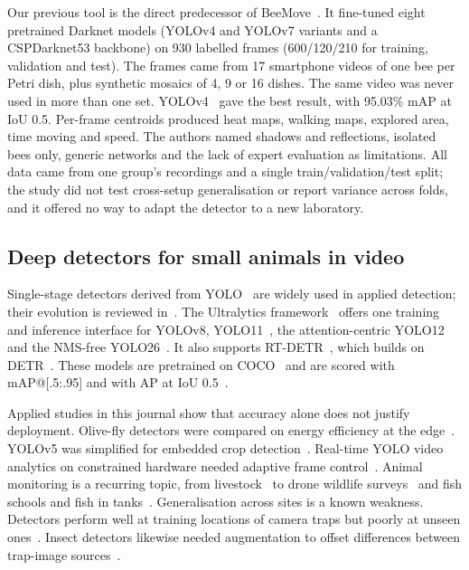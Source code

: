 \documentclass[pdflatex,sn-basic,Numbered]{sn-jnl}
\newcommand{\beemove}{BeeMove}
\theoremstyle{thmstyleone}%
\begin{document}
Our previous tool is the direct predecessor of \beemove{}~\cite{lima2025analyzing}. It fine-tuned eight pretrained Darknet models (YOLOv4 and YOLOv7 variants and a CSPDarknet53 backbone) on 930 labelled frames (600/120/210 for training, validation and test). The frames came from 17 smartphone videos of one bee per Petri dish, plus synthetic mosaics of 4, 9 or 16 dishes. The same video was never used in more than one set. YOLOv4~\cite{bochkovskiy2020yolov4} gave the best result, with 95.03\% mAP at IoU 0.5. Per-frame centroids produced heat maps, walking maps, explored area, time moving and speed. The authors named shadows and reflections, isolated bees only, generic networks and the lack of expert evaluation as limitations. All data came from one group's recordings and a single train/validation/test split; the study did not test cross-setup generalisation or report variance across folds, and it offered no way to adapt the detector to a new laboratory.

\subsection{Deep detectors for small animals in video}\label{sec:rw-detectors}

Single-stage detectors derived from YOLO~\cite{redmon2016you} are widely used in applied detection; their evolution is reviewed in~\cite{terven2023comprehensive,diwan2022object}. The Ultralytics framework~\cite{jocher2023ultralytics} offers one training and inference interface for YOLOv8, YOLO11~\cite{khanam2024yolov11}, the attention-centric YOLO12~\cite{tian2025yolov12} and the NMS-free YOLO26~\cite{jocher2026ultralytics,hidayatullah2026yolo26}. It also supports RT-DETR~\cite{zhao2024detrs}, which builds on DETR~\cite{carion2020end}. These models are pretrained on COCO~\cite{lin2014microsoft} and are scored with mAP@[.5:.95] and with AP at IoU 0.5~\cite{everingham2010the}.

Applied studies in this journal show that accuracy alone does not justify deployment. Olive-fly detectors were compared on energy efficiency at the edge~\cite{mira2024benchmarking}. YOLOv5 was simplified for embedded crop detection~\cite{nnadozie2023simplifying}. Real-time YOLO video analytics on constrained hardware needed adaptive frame control~\cite{lee2021yolo}. Animal monitoring is a recurring topic, from livestock~\cite{wang2024advanced,hsieh2025implementing} to drone wildlife surveys~\cite{vuong2025empirical} and fish schools and fish in tanks~\cite{wang2016robust,cheng2018obtaining}. Generalisation across sites is a known weakness. Detectors perform well at training locations of camera traps but poorly at unseen ones~\cite{beery2018recognition}. Insect detectors likewise needed augmentation to offset differences between trap-image sources~\cite{suto2023improving}.
\end{document}
